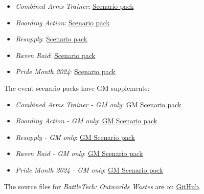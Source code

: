 \begin{itemize}

\item \emph{Combined Arms Trainer}: \href{https://raw.githubusercontent.com/Eudicods/outworlds-wastes/rules-pdf/combined-arms-trainer.pdf}{Scenario pack}

\item \emph{Boarding Action}: \href{https://raw.githubusercontent.com/Eudicods/outworlds-wastes/rules-pdf/boarding-action.pdf}{Scenario pack}

\item \emph{Resupply}: \href{https://raw.githubusercontent.com/Eudicods/outworlds-wastes/rules-pdf/resupply.pdf}{Scenario pack}

\item \emph{Raven Raid}: \href{https://raw.githubusercontent.com/Eudicods/outworlds-wastes/rules-pdf/raven-raid.pdf}{Scenario pack}

\item \emph{Pride Month 2024}: \href{https://raw.githubusercontent.com/Eudicods/outworlds-wastes/rules-pdf/pride-2024.pdf}{Scenario pack}

\end{itemize}

The event scenario packs have GM supplements:

\begin{itemize}

\item \emph{Combined Arms Trainer - GM only}: \href{https://raw.githubusercontent.com/Eudicods/outworlds-wastes/rules-pdf/combined-arms-trainer-gm-only.pdf}{GM Scenario pack}

\item \emph{Boarding Action - GM only}: \href{https://raw.githubusercontent.com/Eudicods/outworlds-wastes/rules-pdf/boarding-action-gm-only.pdf}{GM Scenario pack}

\item \emph{Resupply - GM only}: \href{https://raw.githubusercontent.com/Eudicods/outworlds-wastes/rules-pdf/resupply-gm-only.pdf}{GM Scenario pack}

\item \emph{Raven Raid - GM only}: \href{https://raw.githubusercontent.com/Eudicods/outworlds-wastes/rules-pdf/raven-raid-gm-only.pdf}{GM Scenario pack}

\item \emph{Pride Month 2024 - GM only}: \href{https://raw.githubusercontent.com/Eudicods/outworlds-wastes/rules-pdf/pride-2024-gm-only.pdf}{GM Scenario pack}

\end{itemize}

The source files for \emph{BattleTech: Outworlds Wastes} are on \href{https://github.com/Eudicods/outworlds-wastes}{GitHub}.
